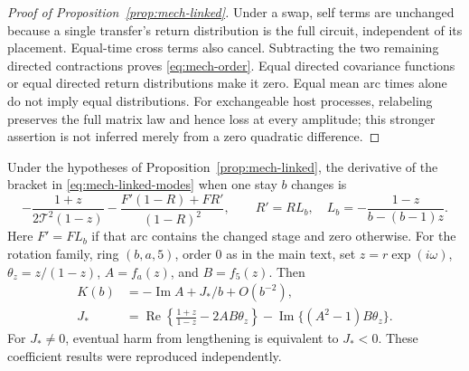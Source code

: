 \begin{proof}[Proof of Proposition~\ref{prop:mech-linked}]
Under a swap, self terms are unchanged because a single transfer's return distribution is the full circuit, independent of its placement. Equal-time cross terms also cancel. Subtracting the two remaining directed contractions proves \eqref{eq:mech-order}. Equal directed covariance functions or equal directed return distributions make it zero. Equal mean arc times alone do not imply equal distributions. For exchangeable host processes, relabeling preserves the full matrix law and hence loss at every amplitude; this stronger assertion is not inferred merely from a zero quadratic difference.
\end{proof}

\begin{lemma}\label{lem:mech-linked-stay}
Under the hypotheses of Proposition~\ref{prop:mech-linked}, the derivative of the bracket in \eqref{eq:mech-linked-modes} when one stay \(b\) changes is
\begin{equation}\label{eq:mech-linked-derivative}
 -\frac{1+z}{2\mathcal T^2(1-z)}-
 \frac{F'(1-R)+FR'}{(1-R)^2},\qquad
 R'=R L_b,\quad L_b=-\frac{1-z}{b-(b-1)z}.
\end{equation}
Here \(F'=FL_b\) if that arc contains the changed stage and zero otherwise. For the rotation family, ring \((b,a,5)\), order 0 as in the main text, set \(z=r\exp(i\omega)\), \(\theta_z=z/(1-z)\), \(A=f_a(z)\), and \(B=f_5(z)\). Then
\begin{align}
 K(b)&=-\operatorname{Im}A+J_*/b+O(b^{-2}),\label{eq:mech-linked-asymptote}\\
 J_*&=\operatorname{Re}\left\{\frac{1+z}{1-z}-2AB\theta_z\right\}
 -\operatorname{Im}\{(A^2-1)B\theta_z\}.\nonumber
\end{align}
For \(J_*\ne0\), eventual harm from lengthening is equivalent to \(J_*<0\). These coefficient results were reproduced independently.
\end{lemma}
